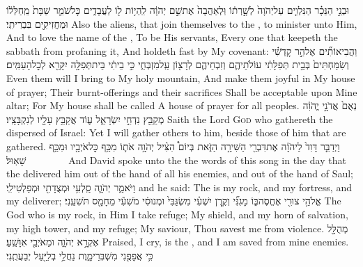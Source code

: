 {וּבְנֵ֣י הַנֵּכָ֗ר הַנִּלְוִ֤ים עַל\maqqaf יְהֹוָה֙ לְשָׁ֣רְת֔וֹ וּֽלְאַהֲבָה֙ אֶת\maqqaf שֵׁ֣ם יְהֹוָ֔ה לִֽהְי֥וֹת ל֖וֹ לַעֲבָדִ֑ים כׇּל\maqqaf שֹׁמֵ֤ר שַׁבָּת֙ מֵֽחַלְּל֔וֹ וּמַחֲזִיקִ֖ים בִּבְרִיתִֽי׃}
{Also the aliens, that join themselves to the \lord, to minister unto Him, And to love the name of the \lord, To be His servants, Every one that keepeth the sabbath from profaning it, And holdeth fast by My covenant:}
{וַהֲבִיאוֹתִ֞ים אֶל\maqqaf הַ֣ר קׇדְשִׁ֗י וְשִׂמַּחְתִּים֙ בְּבֵ֣ית תְּפִלָּתִ֔י עוֹלֹתֵיהֶ֧ם וְזִבְחֵיהֶ֛ם לְרָצ֖וֹן עַֽל\maqqaf מִזְבְּחִ֑י כִּ֣י בֵיתִ֔י בֵּית\maqqaf תְּפִלָּ֥ה יִקָּרֵ֖א לְכׇל\maqqaf הָעַמִּֽים׃}
{Even them will I bring to My holy mountain, And make them joyful in My house of prayer; Their burnt-offerings and their sacrifices Shall be acceptable upon Mine altar; For My house shall be called A house of prayer for all peoples.}
{נְאֻם֙ אֲדֹנָ֣י יֱהֹוִ֔ה מְקַבֵּ֖ץ נִדְחֵ֣י יִשְׂרָאֵ֑ל ע֛וֹד אֲקַבֵּ֥ץ עָלָ֖יו לְנִקְבָּצָֽיו׃}
{Saith the Lord \textsc{God} who gathereth the dispersed of Israel: Yet I will gather others to him, beside those of him that are gathered.}
\newperek
{}
\label{haft_53}
\setcounter{chap}{22}
\setcounter{verse}{1}
{וַיְדַבֵּ֤ר דָּוִד֙ לַיהֹוָ֔ה אֶת\maqqaf דִּבְרֵ֖י הַשִּׁירָ֣ה הַזֹּ֑את בְּיוֹם֩ הִצִּ֨יל יְהֹוָ֥ה אֹת֛וֹ מִכַּ֥ף כׇּל\maqqaf אֹיְבָ֖יו וּמִכַּ֥ף שָׁאֽוּל׃        }
{And David spoke unto the \lord\space the words of this song in the day that the \lord\space delivered him out of the hand of all his enemies, and out of the hand of Saul;}
{וַיֹּאמַ֑ר יְהֹוָ֛ה סַֽלְעִ֥י וּמְצֻדָתִ֖י וּמְפַלְטִי\maqqaf לִֽי׃}
{and he said: The \lord\space is my rock, and my fortress, and my deliverer;}
{אֱלֹהֵ֥י צוּרִ֖י אֶחֱסֶה\maqqaf בּ֑וֹ מָגִנִּ֞י וְקֶ֣רֶן יִשְׁעִ֗י מִשְׂגַּבִּי֙ וּמְנוּסִ֔י מֹשִׁעִ֕י מֵחָמָ֖ס תֹּשִׁעֵֽנִי׃}
{The God who is my rock, in Him I take refuge; My shield, and my horn of salvation, my high tower, and my refuge; My saviour, Thou savest me from violence.}
{מְהֻלָּ֖ל אֶקְרָ֣א יְהֹוָ֑ה וּמֵאֹיְבַ֖י אִוָּשֵֽׁעַ׃}
{Praised, I cry, is the \lord, and I am saved from mine enemies.}
{כִּ֥י אֲפָפֻ֖נִי מִשְׁבְּרֵי\maqqaf מָ֑וֶת נַחֲלֵ֥י בְלִיַּ֖עַל יְבַעֲתֻֽנִי׃}
